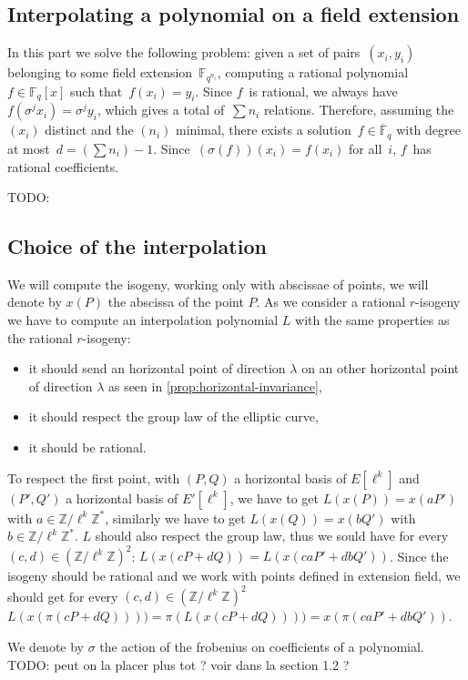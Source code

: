 \documentclass{lms}
\newcommand{\todo}[1]{{\color{red}TODO: #1}}
\newcommand{\F}{\mathbb{F}}
\begin{document}
\subsection{Interpolating a polynomial on a field extension}

In this part we solve the following problem:
given a set of pairs~$(x_i, y_i)$ belonging to
some field extension~$\F_{q^{n_i}}$,
computing a rational polynomial~$f ∈ \F_q[x]$ such that~$f(x_i) = y_i$.
Since $f$~is rational, we always have~$f(σ^j x_i) = σ^j y_i$,
which gives a total of~$∑ n_i$ relations.
Therefore, assuming the $(x_i)$ distinct and the $(n_i)$ minimal,
there exists a solution~$f ∈ \overline{\F}_{q}$
with degree at most~$d = (∑ n_i) - 1$.
Since~$(σ(f)) (x_i) = f(x_i)$ for all~$i$, $f$~has rational coefficients.

\todo{\vrule height 1pt width 10cm}

\subsection{Choice of the interpolation}
We will compute the isogeny, working only with abscissae of points, we will denote by $x(P)$ the abscissa of the point $P$. 
As we consider a rational $r$-isogeny we have to compute an interpolation polynomial $L$ with the same properties as the rational $r$-isogeny: 
\begin{itemize}
\item it should send an horizontal point of direction $\lambda$ on an other horizontal point of direction $\lambda$ as seen in \ref{prop:horizontal-invariance}, 
\item it should respect the group law of the elliptic curve,
\item it should be rational.
\end{itemize}
To respect the first point, with $(P,Q)$ a horizontal basis of $E[\ell^k]$ and $(P',Q')$ a horizontal basis of $E'[\ell^k]$, we have to get $L(x(P))=x(aP')$ with $a \in \mathbb{Z}/\ell^k \mathbb{Z}^*$, similarly we have to get $L(x(Q))=x(bQ')$ with $b \in \mathbb{Z}/\ell^k \mathbb{Z}^*$. $L$ should also respect the group law, thus we sould have for every $(c,d) \in (\mathbb{Z}/\ell^k \mathbb{Z})^2$: $L(x(cP+dQ))=L(x(caP'+dbQ'))$. Since the isogeny should be rational and we work with points defined in extension field, we should get  for every $(c,d) \in (\mathbb{Z}/\ell^k \mathbb{Z})^2$ $L(x(\pi(cP+dQ))))=\pi(L(x(cP+dQ))))=x(\pi(caP'+dbQ'))$.
\newline
\begin{defi} 
We denote by $\sigma$ the action of the frobenius on coefficients of a polynomial. \todo{peut on la placer plus tot ? voir dans la section 1.2 ?}
\end{defi}
\end{document}

